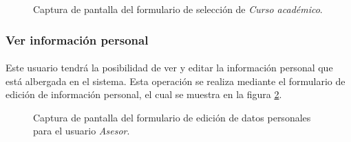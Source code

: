   \begin{figure}[!ht]
    \begin{center}
      \caption{Captura de pantalla del formulario de selección de \textit{Curso académico}.}
      \label{capturaPantallaSetCursoAcademico}
    \end{center}
  \end{figure}

  \subsubsection{Ver información personal}

  \paragraph{}Este usuario tendrá la posibilidad de ver y editar la información
  personal que está albergada en el sistema. Esta operación se realiza mediante
  el formulario de edición de información personal, el cual se muestra en la
  figura \ref{capturaModificarDatosAsesor}.

  \begin{figure}[!ht]
    \begin{center}
      \caption{Captura de pantalla del formulario de edición de datos personales para el usuario \textit{Asesor}.}
      \label{capturaModificarDatosAsesor}
    \end{center}
  \end{figure}


